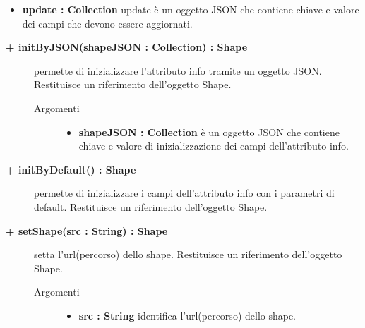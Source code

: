 \begin{description}
\begin{description}
\begin{description}
\begin{itemize}
					\item \textbf{update : Collection			} \hfill
					update è un oggetto JSON che contiene chiave e valore dei campi che devono essere aggiornati. 
				\end{itemize}
		\end{description}

\end{description}

\begin{description}
		\item[\textbf{\color{blue}+ initByJSON(shapeJSON : Collection) : Shape			}] \hfill
			permette di inizializzare l'attributo info tramite un oggetto JSON.  
			Restituisce un riferimento dell'oggetto Shape.
		\begin{description}
			\item[Argomenti] \hfill
				\begin{itemize}
				
					\item \textbf{shapeJSON : Collection			} \hfill
					è un oggetto JSON che contiene chiave e valore di inizializzazione dei campi dell'attributo info. 
				\end{itemize}
		\end{description}

\end{description}

\begin{description}
		\item[\textbf{\color{blue}+ initByDefault() : Shape			}] \hfill
			permette di inizializzare i campi dell'attributo info con i parametri di default. Restituisce un riferimento dell'oggetto Shape. 

\end{description}

\begin{description}
		\item[\textbf{\color{blue}+ setShape(src : String) : Shape			}] \hfill
			setta l'url(percorso) dello shape. Restituisce un riferimento dell'oggetto Shape.
			
		\begin{description}
			\item[Argomenti] \hfill
				\begin{itemize}
				
					\item \textbf{src : String			} \hfill
					identifica l'url(percorso) dello shape.
				\end{itemize}
		\end{description}


\end{description}
\end{description}
